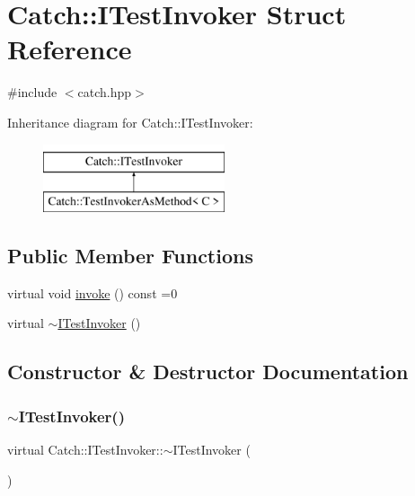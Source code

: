 \hypertarget{struct_catch_1_1_i_test_invoker}{}\section{Catch\+::I\+Test\+Invoker Struct Reference}
\label{struct_catch_1_1_i_test_invoker}


{\ttfamily \#include $<$catch.\+hpp$>$}

Inheritance diagram for Catch\+::I\+Test\+Invoker\+:\begin{figure}[H]
\begin{center}
\leavevmode
\includegraphics[height=2.000000cm]{struct_catch_1_1_i_test_invoker}
\end{center}
\end{figure}
\subsection*{Public Member Functions}
\begin{DoxyCompactItemize}
\item 
virtual void \mbox{\hyperlink{struct_catch_1_1_i_test_invoker_a6fcd5c5b67d6d5ade6491ff33411ca7f}{invoke}} () const =0
\item 
virtual \mbox{\hyperlink{struct_catch_1_1_i_test_invoker_a2c89f3eece5b1b677243766e409bd831}{$\sim$\+I\+Test\+Invoker}} ()
\end{DoxyCompactItemize}


\subsection{Constructor \& Destructor Documentation}
\mbox{\label{struct_catch_1_1_i_test_invoker_a2c89f3eece5b1b677243766e409bd831}} 
\subsubsection{\texorpdfstring{$\sim$ITestInvoker()}{~ITestInvoker()}}
{\footnotesize\ttfamily virtual Catch\+::\+I\+Test\+Invoker\+::$\sim$\+I\+Test\+Invoker (\begin{DoxyParamCaption}{ }\end{DoxyParamCaption})\hspace{0.3cm}{\ttfamily [virtual]}}




